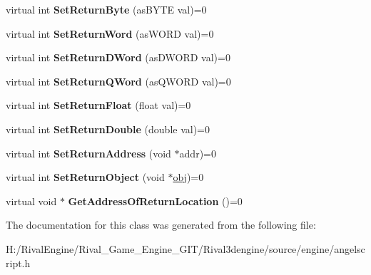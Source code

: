 \begin{DoxyCompactItemize}
virtual int {\bfseries Set\+Return\+Byte} (as\+B\+Y\+TE val)=0
\item 
\mbox{\label{classas_i_script_generic_a9c51e3ff3f4fb37f6b4c82a050319955}} 
virtual int {\bfseries Set\+Return\+Word} (as\+W\+O\+RD val)=0
\item 
\mbox{\label{classas_i_script_generic_a3260e1f3b76791713bced9af0b81bdbc}} 
virtual int {\bfseries Set\+Return\+D\+Word} (as\+D\+W\+O\+RD val)=0
\item 
\mbox{\label{classas_i_script_generic_a25f5ec30c666ffbb51edeedfd4c89546}} 
virtual int {\bfseries Set\+Return\+Q\+Word} (as\+Q\+W\+O\+RD val)=0
\item 
\mbox{\label{classas_i_script_generic_acc2fddd4175ad35854cec8f5c38a6495}} 
virtual int {\bfseries Set\+Return\+Float} (float val)=0
\item 
\mbox{\label{classas_i_script_generic_a8a720ef33859981dd941c616b2c83cad}} 
virtual int {\bfseries Set\+Return\+Double} (double val)=0
\item 
\mbox{\label{classas_i_script_generic_afd8ead96f17d6e77f3a26c70c3a1d80c}} 
virtual int {\bfseries Set\+Return\+Address} (void $\ast$addr)=0
\item 
\mbox{\label{classas_i_script_generic_a94c9ca32722cb44b09211e51fa906e6e}} 
virtual int {\bfseries Set\+Return\+Object} (void $\ast$\hyperlink{structobj}{obj})=0
\item 
\mbox{\label{classas_i_script_generic_a103a91f081ec894a116cd3db06b0d8d1}} 
virtual void $\ast$ {\bfseries Get\+Address\+Of\+Return\+Location} ()=0
\end{DoxyCompactItemize}


The documentation for this class was generated from the following file\+:\begin{DoxyCompactItemize}
\item 
H\+:/\+Rival\+Engine/\+Rival\+\_\+\+Game\+\_\+\+Engine\+\_\+\+G\+I\+T/\+Rival3dengine/source/engine/angelscript.\+h\end{DoxyCompactItemize}
